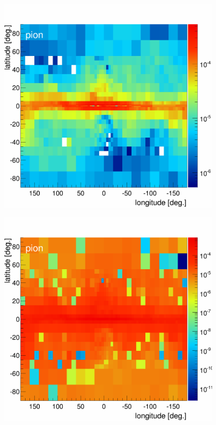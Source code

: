 \begin{figure}[h]
  \centering
  \begin{minipage}[h]{0.3\textwidth}
  	\centering
	\includegraphics[width=1.\linewidth]{pic/discussion/MCRonly_PCR_integral_flux.png}
  	\label{}
  \end{minipage}
  \hfill
  \begin{minipage}[h]{0.3\textwidth}
	  \centering
	  \includegraphics[width=1.\linewidth]{pic/discussion/DMonly_PCR_integral_flux.png}

\end{minipage}
\end{figure}
